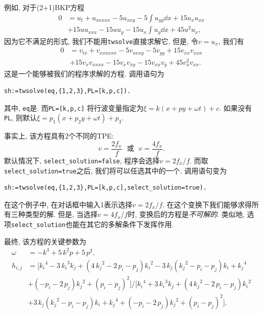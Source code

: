 例如, 对于(2+1)BKP方程\CITEbaBKP
\begin{equation}
\begin{split}
0&=u_t+u_{xxxxx}-5u_{xxy}-5\int{u_{yy}\dd{x}}+15u_xu_{xx}\\
&+15uu_{xxx}-15uu_y-15u_x\int{u_y\dd{x}}+45u^2u_x, \label{BKP}
\end{split}
\end{equation}
因为它不满足的形式, 我们不能用\texttt{twsolve}直接求解它. 但是, 令$v=u_x$, 我们有
\begin{equation}
\begin{split}
0&=v_{tx}+v_{xxxxxx}-5v_{xxxy}-5v_{yy}+15v_{xx}v_{xxx}\\
&+15v_xv_{xxxx}-15v_xv_{xy}-15v_{xx}v_y+45v_x^2v_{xx}. \label{BKP-T}
\end{split}
\end{equation}
这是一个能够被我们的程序求解的方程. 调用语句为
\begin{verbatim}
sh:=twsolve(eq,{1,2,3},PL=[k,p,c]).
\end{verbatim}
其中, \texttt{eq}是. 而\texttt{PL=[k,p,c]} 将行波变量指定为$\xi=k(x+py+\omega t)+c$. 如果没有\texttt{PL}, 则默认$\xi=p_1(x+p_2 y+\omega t)+p_3$. 

事实上, 该方程具有2个不同的TPE:
\begin{equation}
v=\frac{2f_x}{f} \text{~~或~~} v=\frac{4f_x}{f}.
\end{equation}
默认情况下, \texttt{select\_solution=false}, 程序会选择$v=2f_x/f$. 而取\texttt{select\_solution=true}之后, 我们将可以任选其中的一个. 调用语句变为
\begin{verbatim}
sh:=twsolve(eq,{1,2,3},PL=[k,p,c],select_solution=true).
\end{verbatim}
在这个例子中, 在对话框中输入1表示选择$v=2f_x/f$. 在这个变换下我们能够求得所有三种类型的解. 但是, 当选择$v=4f_x/f$时, 变换后的方程是\emph{不可解的}. 类似地, 选项\texttt{select\_solution}也能在其它的多解条件下发挥作用.

最终, 该方程的关键参数为
\begin{equation}
\begin{split}
\omega&=-{k}^{4}+5\,{k}^{2}p+5\,{p}^{2}, \\ 
h_{i,j}&=[{k_{{i}}}^{4}-3\,{k_{{i}}}^{3}k_{{j}}+ \left( 4\,{k_{{j}}}^{2}-2\,p_{{i}}-p_{{j}} \right) {k_{{i}}}^{2}-3\,k_{{j}} \left( {k_{{j}}}^{2}-p_{{i}}-p_{{j}} \right) k_{{i}}+{k_{{j}}}^{4}\\
&+\left( -p_{{i}}-2\,p_{{j}}\right) {k_{{j}}}^{2}+ \left( p_{{i}}-p_{{j}} \right) ^{2}]/[{k_{{i}}}^{4}+3\,{k_{{i}}}^{3}k_{{j}}+ \left( 4\,{k_{{j}}}^{2}-2\,p_{{i}}-p_{{j}} \right) {k_{{i}}}^{2}\\
&+3\,k_{{j}} \left( {k_{{j}}}^{2}-p_{{i}}-p_{{j}} \right) k_{{i}}+{k_{{j}}}^{4}+ \left( -p_{{i}}-2\,p_{{j}}\right) {k_{{j}}}^{2}+ \left( p_{{i}}-p_{{j}} \right) ^{2}].
\end{split}
\end{equation}

